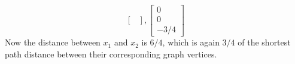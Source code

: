 \documentclass{article}
\newcommand{\0}{\mathbf{0}}
\begin{document}
\begin{enumerate}
\begin{enumerate}
\begin{equation*}
\begin{bmatrix}
          \end{bmatrix},
          \begin{bmatrix}
            0 \\ 0 \\ -3/4
          \end{bmatrix}
        \end{equation*}
        Now the distance between $x_1$ and $x_2$ is $6/4$, which is again $3/4$ of the shortest path distance between their corresponding graph vertices.
      \end{enumerate}
    \end{enumerate}

    \printbibliography

    
\end{document}
